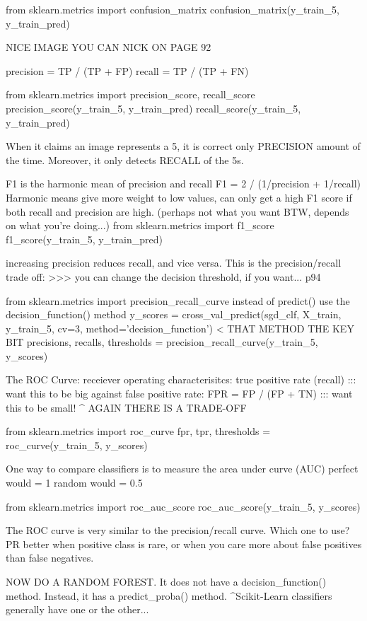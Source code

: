 from sklearn.metrics import confusion_matrix
confusion_matrix(y_train_5, y_train_pred)

NICE IMAGE YOU CAN NICK ON PAGE 92

precision = TP / (TP + FP)
recall = TP / (TP + FN)

from sklearn.metrics import precision_score, recall_score
precision_score(y_train_5, y_train_pred)
recall_score(y_train_5, y_train_pred)

When it claims an image represents a 5,
it is correct only PRECISION amount of the time.
Moreover, it only detects RECALL of the 5s.

F1 is the harmonic mean of precision and recall
F1 = 2 / (1/precision + 1/recall)
Harmonic means give more weight to low values,
can only get a high F1 score if both recall and precision are high.
(perhaps not what you want BTW, depends on what you're doing...)
from sklearn.metrics import f1_score
f1_score(y_train_5, y_train_pred)

increasing precision reduces recall, and vice versa.
This is the precision/recall trade off:
>>> you can change the decision threshold, if you want... p94

from sklearn.metrics import precision_recall_curve
instead of predict() use the decision_function() method
y_scores = cross_val_predict(sgd_clf, X_train, y_train_5, cv=3, method='decision_function') < THAT METHOD THE KEY BIT
precisions, recalls, thresholds = precision_recall_curve(y_train_5, y_scores)

The ROC Curve:
receiever operating characterisitcs:
true positive rate (recall) ::: want this to be big
against false positive rate:
FPR = FP / (FP + TN) ::: want this to be small!
^ AGAIN THERE IS A TRADE-OFF

from sklearn.metrics import roc_curve
fpr, tpr, thresholds = roc_curve(y_train_5, y_scores)

One way to compare classifiers is to measure the area under curve (AUC)
perfect would = 1
random would = 0.5

from sklearn.metrics import roc_auc_score
roc_auc_score(y_train_5, y_scores)

The ROC curve is very similar to the precision/recall curve.
Which one to use?
PR better when positive class is rare,
or when you care more about false positives than false negatives.

NOW DO A RANDOM FOREST.
It does not have a decision_function() method.
Instead, it has a predict_proba() method.
^Scikit-Learn classifiers generally have one or the other...

